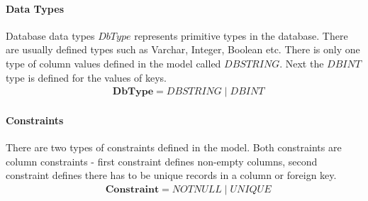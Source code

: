 \documentclass[11pt]{article}
\begin{document}
\paragraph{Data Types} Database data types $DbType$ represents primitive types in the database. There are usually defined types such as Varchar, Integer, Boolean etc. There is only one type of column values defined in the model called $DBSTRING$. Next the $DBINT$ type is defined for the values of keys.
\begin{align*}
&	\mathbf{DbType} = DBSTRING \; | \; DBINT
\end{align*}

\paragraph{Constraints} There are two types of constraints defined in the model. Both constraints are column constraints - first constraint defines non-empty columns, second constraint defines there has to be unique records in a column or foreign key.
\begin{align*}
&	\mathbf{Constraint} = NOTNULL \; | \; UNIQUE 
\end{align*}

\end{document}

